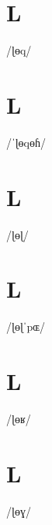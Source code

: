 \documentclass[10pt,a4paper,twoside]{book}
\begin{document}
\section*{L}

\begin{multicols}{3}
 {/ɭɵq/} {}
\end{multicols}

\section*{L}

\begin{multicols}{3}
 {/ˈɭɵqɵɦ/} {}
\end{multicols}

\section*{L}

\begin{multicols}{3}
 {/ɭɵɭ/} {}
\end{multicols}

\section*{L}

\begin{multicols}{3}
 {/ɭɵɭˈpɶ/} {}
\end{multicols}

\section*{L}

\begin{multicols}{3}
 {/ɭɵʁ/} {}
\end{multicols}

\section*{L}

\begin{multicols}{3}
 {/ɭɵɣ/} {}
\end{multicols}
\end{document}
